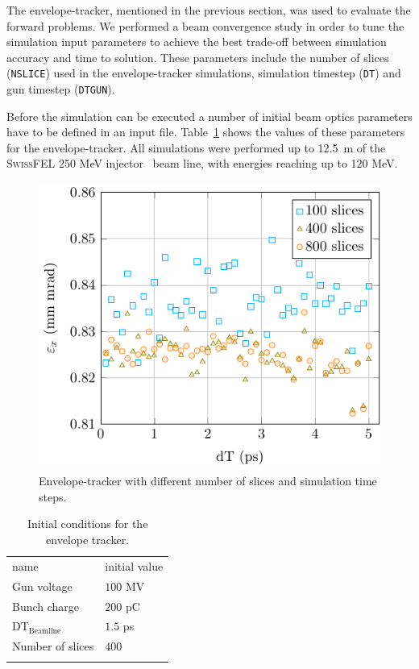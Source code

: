 The envelope-tracker, mentioned in the previous section, was used to evaluate
  the forward problems.
We performed a beam convergence study in order to tune the simulation input
  parameters to achieve the best trade-off between simulation accuracy and
  time to solution.
These parameters include the number of slices (\texttt{NSLICE}) used in the
  envelope-tracker simulations, simulation timestep (\texttt{DT}) and gun
  timestep (\texttt{DTGUN}).

Before the simulation can be executed a number of initial beam optics
  parameters have to be defined in an input file.
Table~\ref{tbl:et_params} shows the values of these parameters for the
  envelope-tracker.
All simulations were performed up to 12.5~m of the
  \textsc{SwissFEL} 250 MeV injector~\cite{pedr:10} beam line, with
  energies reaching  up to 120 MeV.

\begin{figure}%
  \centering
  \includegraphics[width=0.8\linewidth]{Report/dt_scan}
  \caption{Envelope-tracker with different number of slices and simulation
    time steps.}
  \label{fig:et-dt}
\end{figure}

\begin{table}
  \begin{center}
    \caption{Initial conditions for the envelope tracker.}
    \label{tbl:et_params}
    \begin{tabular}{ll}
      \hline\noalign{\smallskip}
      name & initial value \\
      \noalign{\smallskip}\hline\noalign{\smallskip}
        Gun voltage       & $100$ MV\\
        Bunch charge      & $200$ pC\\
        DT$_{\text{Beamline}}$  & $1.5$ ps\\
        Number of slices  & $400$ \\
      \noalign{\smallskip}\hline
    \end{tabular}
  \end{center}
\end{table}

